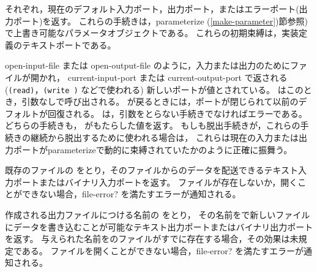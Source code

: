 \begin{entry}{%
}

それぞれ，現在のデフォルト入力ポート，出力ポート，またはエラーポート(出力ポート)を返す。
これらの手続きは，{\cf parameterize} (\ref{make-parameter})節参照)で上書き可能なパラメータオブジェクトである。
これらの初期束縛は，実装定義のテキストポートである。

\end{entry}


\begin{entry}{%
}

{\cf open-input-file} または {\cf open-output-file} のように，入力または出力のためにファイルが開かれ，
{\cf current-input-port} または {\cf current-output-port} で返される
({\tt (read)}，{\tt (write )} などで使われる) 新しいポートが値とされている。
 はこのとき，引数なしで呼び出される。
 が戻るときには，ポートが閉じられて以前のデフォルトが回復される。
 は，引数をとらない手続きでなければエラーである。
どちらの手続きも， がもたらした値を返す。
もしも脱出手続きが，これらの手続きの継続から脱出するために使われる場合は，
これらは現在の入力または出力ポートが{\cf parameterize}で動的に束縛されていたかのように正確に振舞う。


\end{entry}


\begin{entry}{%
}
 
既存のファイルの  をとり，そのファイルからのデータを配送できるテキスト入力ポートまたはバイナリ入力ポートを返す。
ファイルが存在しないか，開くことができない場合，{\cf file-error?} を満たすエラーが通知される。

\end{entry}


\begin{entry}{%
}

作成される出力ファイルにつける名前の  をとり，
その名前をで新しいファイルにデータを書き込むことが可能なテキスト出力ポートまたはバイナリ出力ポートを返す。
与えられた名前をのファイルがすでに存在する場合，その効果は未規定である。
ファイルを開くことができない場合，{\cf file-error?} を満たすエラーが通知される。

\end{entry}


